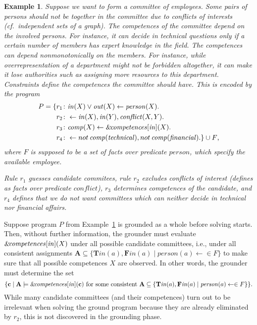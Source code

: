 \documentclass[11pt,fleqn,twoside]{article}
\renewcommand{\vec}[1]{\ensuremath{\mb{#1}}}
\newcommand{\mb}[1]{\ensuremath{\mathbf{#1}}}
\def\naf{\ensuremath{\mathop{not}}}
\newcommand{\amp}[1]{\ensuremath{\text{\textsl{{\&}}}\!\mathit{#1}}}
\newcommand{\ext}[3]{\ensuremath{\amp{#1}[#2](#3)}}
\newcommand{\T}{\mathbf{T}}
\newcommand{\F}{\mathbf{F}}
\newcommand{\Assignment}{\ensuremath{\mathbf{A}}}
\newtheorem{example}{Example}
\begin{document}
			\begin{example}
				\label{ex:committee}
				Suppose we want to form a committee of employees.
				Some pairs of persons should not be together in the committee due to conflicts of interests
				(cf.~independent sets of a graph).
				The competences of the committee depend on the involved persons.
				For instance, it can decide in technical questions only if a certain number of members has expert knowledge in the field.
				The competences can depend nonmonotonically on the members.
				For instance, while overrepresentation of a department might not be forbidden altogether,
				it can make it lose authorities such as assigning more resources to this department.
				Constraints define the competences the committee should have.
				This is encoded by the program
				\begin{align*}
					P = \{ r_1\colon& \mathit{in}(X) \vee \mathit{out}(X) \leftarrow \mathit{person}(X). \\
							r_2\colon&  \leftarrow\mathit{in}(X), \mathit{in}(Y), \mathit{conflict}(X,Y). \\
							r_3\colon& \mathit{comp}(X) \leftarrow \ext{\mathit{competences}}{\mathit{in}}{X}. \\
							r_4\colon& \leftarrow \naf \mathit{comp}(\mathit{technical}), \naf \mathit{comp}(\mathit{financial}). \} \cup F\text{,}
				\end{align*}
				where $F$ is supposed to be a set of facts over predicate $\mathit{person}$, which specify the available employee.
				
				Rule $r_1$ guesses candidate commitees, rule $r_2$ excludes conflicts of interest
				(defines as facts over predicate $\mathit{conflict}$), $r_3$ determines competences of the candidate,
				and $r_4$ defines that we do not want committees which can neither decide in technical nor financial affairs.
			\end{example}

			Suppose program $P$ from Example~\ref{ex:committee} is grounded as a whole before solving starts.
			Then, without further information, the grounder must evaluate $\ext{\mathit{competences}}{\mathit{in}}{X}$
			under all possible candidate committees, i.e.,
			under all consistent assignments $\Assignment \subseteq \{ \T \mathit{in}(a), \F \mathit{in}(a) \mid \mathit{person}(a) \leftarrow \in F \}$
			to make sure that all possible competences $X$ are observed.
			In other words, the grounder must determine the set
			$$\{ \vec{c} \mid \Assignment \models \ext{\mathit{competences}}{\mathit{in}}{\vec{c}} \text{ for some consistent } \Assignment \subseteq \{ \T \mathit{in}(a), \F \mathit{in}(a) \mid \mathit{person}(a) \leftarrow \in F \} \}\text{.}$$
			While many candidate committees (and their competences) turn out to be irrelevant when solving the ground program
			because they are already eliminated by $r_2$, this is not discovered in the grounding phase.
\end{document}
